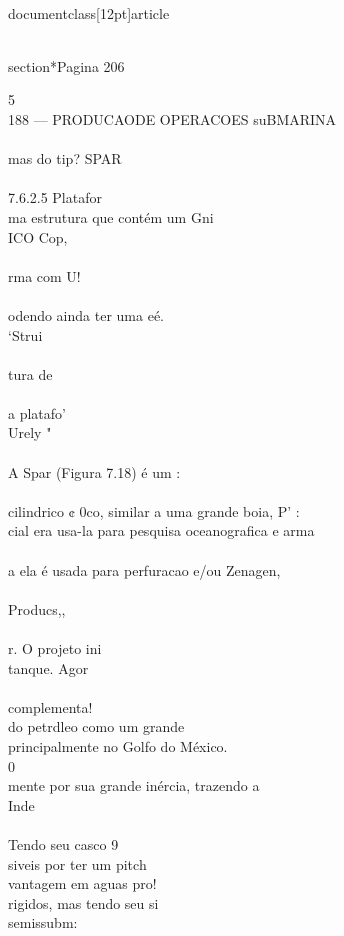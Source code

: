 \\documentclass[12pt]{article}
\begin{document}
\\section*{Pagina 206}

5\\
188 — PRODUCAODE OPERACOES suBMARINA\\
\\
mas do tip? SPAR\\
\\
7.6.2.5 Platafor\\
ma estrutura que contém um Gni\\
ICO Cop,\\
\\
rma com U!\\
\\
odendo ainda ter uma eé.\\
‘Strui\\
\\
tura de\\
\\
a platafo’\\
Urely "\\
\\
A Spar (Figura 7.18) é um :\\
\\
cilindrico ¢ 0co, similar a uma grande boia, P' :\\
cial era usa-la para pesquisa oceanografica e arma\\
\\
a ela é usada para perfuracao e/ou Zenagen,\\
\\
Producs,,\\
\\
r. O projeto ini\\
tanque. Agor\\
\\
complementa!\\
do petrdleo como um grande\\
principalmente no Golfo do México.\\
0\\%
mente por sua grande inércia, trazendo a\\
Inde\\
\\
Tendo seu casco 9\\
siveis por ter um pitch\\
vantagem em aguas pro!\\
rigidos, mas tendo seu si\\
semissubm:\\
\end{document}

